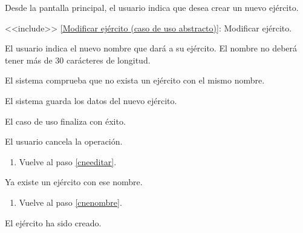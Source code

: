 {
  \item Desde la pantalla principal, el usuario indica que desea crear un nuevo ejército.
  \item <<include>> \ref{Modificar ejército (caso de uso abstracto)}: Modificar ejército. \label{cneeditar}
  \item El usuario indica el nuevo nombre que dará a su ejército. El nombre no deberá tener más de 30 carácteres de longitud. \label{cnenombre}
  \item El sistema comprueba que no exista un ejército con el mismo nombre. \label{cneexist}
  \item El sistema guarda los datos del nuevo ejército.
  \item El caso de uso finaliza con éxito.
}
{
  \item[\ref{cnenombre}:] El usuario cancela la operación. 
    \begin{enumerate}
    \item Vuelve al paso \ref{cneeditar}.
    \end{enumerate}
  \item[\ref{cneexist}:] Ya existe un ejército con ese nombre.
    \begin{enumerate}
    \item Vuelve al paso \ref{cnenombre}.
    \end{enumerate}
}{El ejército ha sido creado.}
